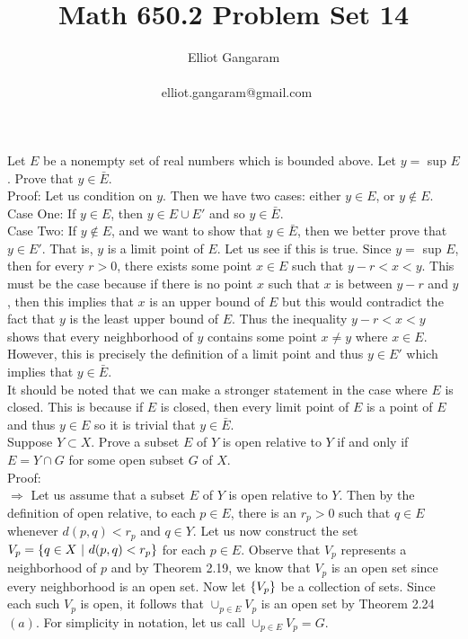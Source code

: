 \documentclass[12pt]{article}
\title{Math 650.2  Problem Set 14}
\author{Elliot Gangaram\\
\date{}
\ elliot.gangaram@gmail.com \\}
\begin{document}
\maketitle

\problem Let $E$ be a nonempty set of real numbers which is bounded above. Let $y =$ sup $E$. Prove that $y \in \bar{E}$. \\ 

Proof: Let us condition on $y$. Then we have two cases: either $y \in E$, or $y \notin E$. \\ 

Case One: If $y \in E$, then $y \in E \cup E'$ and so $y \in \bar{E}$. \\

Case Two: If $y \notin E$, and we want to show that $y \in \bar{E}$, then we better prove that $y \in E'$. That is, $y$ is a limit point of $E$. Let us see if this is true. Since $y=$  sup $E$, then for every $r>0$, there exists some point $x \in E$ such that $y-r<x<y$. This must be the case because if there is no point $x$ such that $x$ is between $y-r$ and $y$, then this implies that $x$ is an upper bound of $E$ but this would contradict the fact that $y$ is the least upper bound of $E$. Thus the inequality $y-r<x<y$ shows that every neighborhood of $y$ contains some point $x \neq y$ where $x \in E$. However, this is precisely the definition of a limit point and thus $y \in E'$ which implies that $y \in \bar{E}$. \\ 

It should be noted that we can make a stronger statement in the case where $E$ is closed. This is because if $E$ is closed, then every limit point of $E$ is a point of $E$ and thus $y \in E$ so it is trivial that $y \in \bar{E}$. \\

\problem Suppose $Y \subset X$. Prove  a subset $E$ of $Y$ is open relative to $Y$ if and only if $E = Y \cap G$ for some open subset $G$ of $X$. \\

Proof: \\

$\Rightarrow$ Let us assume that a subset $E$ of $Y$ is open relative to $Y$. Then by the definition of open relative, to each $p \in E$, there is an $r_{p}>0$ such that $q \in E$ whenever $d(p,q)<r_{p}$ and $q \in Y$. Let us now construct the set $V_{p} = \left\{q \in X~|~ d(p,q)<r_{p}\right\}$ for each $p \in E$. Observe that $V_{p}$ represents a neighborhood of $p$ and by Theorem 2.19, we know that $V_{p}$ is an open set since every neighborhood is an open set. Now let $\left\{V_{p}\right\}$ be a collection of sets. Since each such $V_{p}$ is open, it follows that $\cup_{p \in E} V_{p}$ is an open set by Theorem 2.24$(a)$. For simplicity in notation, let us call $\cup_{p \in E} V_{p}=G$. \\ 
\end{document}
